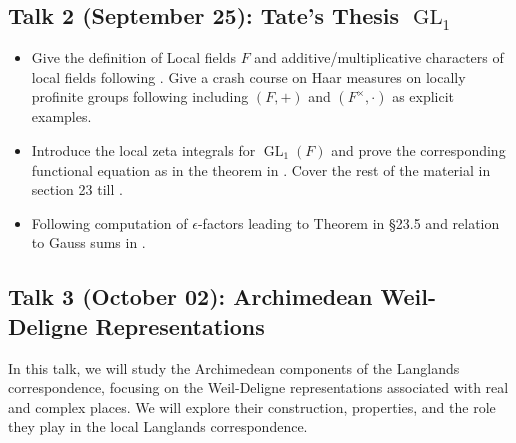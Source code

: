 \documentclass[11pt]{amsart}
\DeclareMathOperator{\Gl}{GL}
\begin{document}
\subsection{Talk 2 (September 25): Tate's Thesis $\Gl_1$}
\begin{itemize}
    \item Give the definition of Local fields $F$ and additive/multiplicative characters of local fields following \cite[\S 1.1 - 1.4, \S 1.6-1.8]{BH06}. Give a crash course on Haar measures on locally profinite groups following \cite[\S 3.1-3.4]{BH06} including $(F,+)$ and $(F^\times,\cdot)$ as explicit examples.
    
    \item Introduce the local zeta integrals for $\Gl_1(F)$ and prove the corresponding functional equation as in the theorem in \cite[\S 23.1-23.2]{BH06}. Cover the rest of the material in section 23 till \cite[\S 23.4]{BH06}.

    \item Following \cite[\S 23.5-23.7]{BH06} computation of $\epsilon$-factors leading to Theorem in \S 23.5 and relation to Gauss sums in \cite[\S 23.6]{BH06}.
    
\end{itemize}

\subsection{Talk 3 (October 02): Archimedean Weil-Deligne Representations}
In this talk, we will study the Archimedean components of the Langlands correspondence, focusing on the Weil-Deligne representations associated with real and complex places. We will explore their construction, properties, and the role they play in the local Langlands correspondence.
\end{document}
